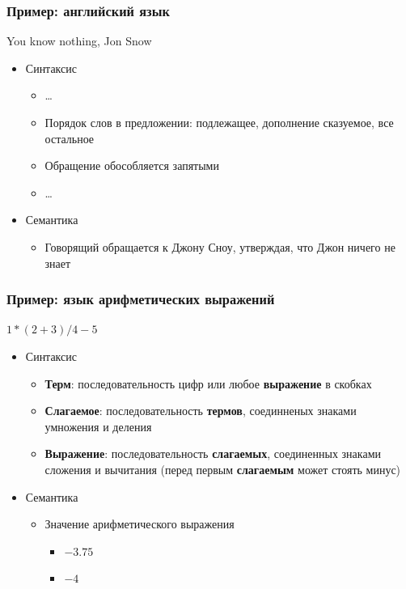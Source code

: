 \documentclass{beamer}
\begin{document}
\begin{frame}[fragile]
  \transwipe[direction=90]
  \frametitle{Пример: английский язык}

\begin{center}
    You know nothing, Jon Snow
\end{center}
  
  \begin{itemize}
    \item Синтаксис
    \begin{itemize}
      \item \dots
      \item Порядок слов в предложении: подлежащее, дополнение сказуемое, все остальное
      \item Обращение обособляется запятыми
      \item \dots
    \end{itemize}
    \item Семантика
    \begin{itemize}
      \item Говорящий обращается к Джону Сноу, утверждая, что Джон ничего не знает
    \end{itemize}
  \end{itemize}
\end{frame}

\begin{frame}[fragile]
  \transwipe[direction=90]
  \frametitle{Пример: язык арифметических выражений}
  $1 * (2 + 3) / 4 - 5$ 
  
  \begin{itemize}
    \item Синтаксис
    \begin{itemize}
      \item \textbf{Терм}: последовательность цифр или любое \textbf{выражение} в скобках
      \item \textbf{Слагаемое}: последовательность \textbf{термов}, соединненых знаками умножения и деления
      \item \textbf{Выражение}: последовательность \textbf{слагаемых}, соединенных знаками сложения и вычитания (перед первым \textbf{слагаемым} может стоять минус)
    \end{itemize}
    \item Семантика
    \begin{itemize}
      \item Значение арифметического выражения
      \pause
      \begin{itemize}
        \item $-3.75$
        \item $-4$
      \end{itemize}
    \end{itemize}
  \end{itemize}
\end{frame}
\end{document}
